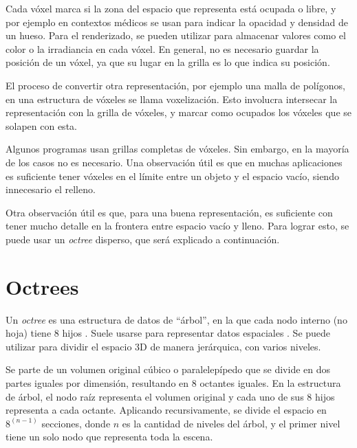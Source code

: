 

Cada vóxel marca si la zona del espacio que representa está ocupada o libre, y por ejemplo en contextos médicos se usan para indicar la opacidad y densidad de un hueso.
Para el renderizado, se pueden utilizar para almacenar valores como el color o la irradiancia en cada vóxel.
En general, no es necesario guardar la posición de un vóxel, ya que su lugar en la grilla es lo que indica su posición.

El proceso de convertir otra representación, por ejemplo una malla de polígonos, en una estructura de vóxeles se llama voxelización.
Esto involucra intersecar la representación con la grilla de vóxeles, y marcar como ocupados los vóxeles que se solapen con esta.

Algunos programas usan grillas completas de vóxeles.
Sin embargo, en la mayoría de los casos no es necesario.
Una observación útil es que en muchas aplicaciones es suficiente tener vóxeles en el límite entre un objeto y el espacio vacío, siendo innecesario el relleno.

Otra observación útil es que, para una buena representación, es suficiente con tener mucho detalle en la frontera entre espacio vacío y lleno.
Para lograr esto, se puede usar un \textit{octree} disperso, que será explicado a continuación.

\section{Octrees}\label{sec:octree}

Un \textit{octree} es una estructura de datos de ``árbol'', en la que cada nodo interno (no hoja) tiene $8$ hijos \cite{rtr}.
Suele usarse para representar datos espaciales \cite{octree-textures}.
Se puede utilizar para dividir el espacio 3D de manera jerárquica, con varios niveles.

Se parte de un volumen original cúbico o paralelepípedo que se divide en dos partes iguales por dimensión, resultando en $8$ octantes iguales.
En la estructura de árbol, el nodo raíz representa el volumen original y cada uno de sus $8$ hijos representa a cada octante.
Aplicando recursivamente, se divide el espacio en $8^{(n - 1)}$ secciones, donde $n$ es la cantidad de niveles del árbol, y el primer nivel tiene un solo nodo que representa toda la escena.

